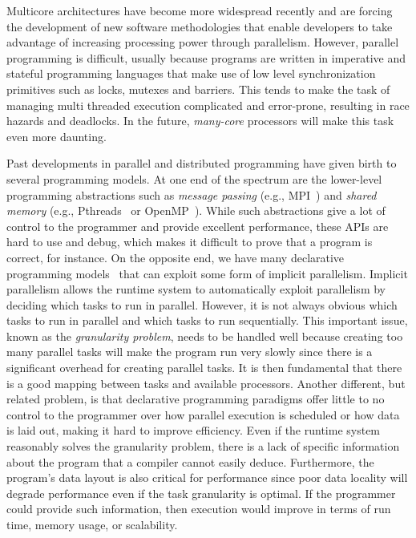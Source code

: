 Multicore architectures have become more widespread recently and are forcing the
development of new software methodologies that enable developers to take
advantage of increasing processing power through parallelism. However, parallel
programming is difficult, usually because programs are written in imperative and
stateful programming languages that make use of low level synchronization
primitives such as locks, mutexes and barriers. This tends to make the task of
managing multi threaded execution complicated and error-prone, resulting in race
hazards and deadlocks. In the future, \emph{many-core} processors will make this
task even more daunting.

Past developments in parallel and distributed programming have given birth to
several programming models. At one end of the spectrum are the lower-level
programming abstractions such as \emph{message passing} (e.g.,
MPI~\cite{gabriel04-open-mpi}) and \emph{shared memory} (e.g.,
Pthreads~\cite{Butenhof:1997:PPT:263953} or
OpenMP~\cite{Chapman-2007-UOP-1370966}). While such abstractions give a lot of
control to the programmer and provide excellent performance, these APIs are hard
to use and debug, which makes it difficult to prove that a program is correct,
for instance. On the opposite end, we have many declarative programming
models~\cite{Blelloch:1996:PPA:227234.227246} that can exploit some form of
implicit parallelism. Implicit parallelism allows the runtime system to
automatically exploit parallelism by deciding which tasks to run in parallel.
However, it is not always obvious which tasks to run in parallel and which tasks
to run sequentially. This important issue, known as the \emph{granularity
problem}, needs to be handled well because creating too many parallel tasks will
make the program run very slowly since there is a significant overhead for
creating parallel tasks. It is then fundamental that there is a good mapping
between tasks and available processors.  Another different, but related problem,
is that declarative programming paradigms offer little to no control to the
programmer over how parallel execution is scheduled or how data is laid out,
making it hard to improve efficiency. Even if the runtime system reasonably
solves the granularity problem, there is a lack of specific information about
the program that a compiler cannot easily deduce. Furthermore, the program's
data layout is also critical for performance since poor data locality will
degrade performance even if the task granularity is optimal.  If the programmer
could provide such information, then execution would improve in terms of run
time, memory usage, or scalability.

